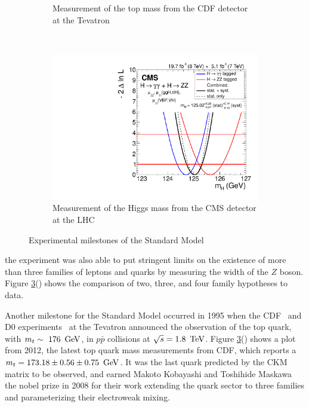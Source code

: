\begin{figure}
\begin{subfigure}[h]{0.3\textwidth}
     \caption{Measurement of the top mass from the CDF detector at the
       Tevatron \cite{ex:CDF_Top_Mass_image}} \label{fig:topMass_CDF}
   \end{subfigure}
   ~ %
   \begin{subfigure}[h]{0.3\textwidth}
     \includegraphics[width=\textwidth]{Figures/Experimental_Results/CMS_higgsMass_scan_1d_all.pdf}
     \caption{Measurement of the Higgs mass from the CMS detector at
       the LHC \cite{ex:CMS_Higgs_Mass_image}} \label{fig:higgsMass_CMS}
   \end{subfigure}
   \caption{Experimental milestones of the Standard Model}\label{fig:ex_milestones_sm}
\end{figure}

\noindent the experiment was also able to put stringent limits on the
existence of more than three families of leptons and quarks by
measuring the width of the $Z$ boson.  Figure
\ref{fig:ex_milestones_sm}() shows the
comparison of two, three, and four family hypotheses to data.   

\par Another milestone for the Standard Model occurred in 1995 when the
CDF~\cite{ex:CDF_topQuark} and D0 experiments~\cite{ex:D0_topQuark} at
the Tevatron announced the observation of the top quark, with
$m_{t}\sim~176~\,\text{Ge\hspace{-.08em}V}$, in $p\bar{p}$ collisions at $\sqrt{s}=1.8~\,\text{Te\hspace{-.08em}V}$.
Figure \ref{fig:ex_milestones_sm}() shows a
plot from 2012, the latest top quark mass measurements from CDF, which
reports a $m_{t} = 173.18 \pm 0.56 \pm 0.75~\,\text{Ge\hspace{-.08em}V}$. It was the last
quark predicted by the CKM matrix to be observed, and earned Makoto
Kobayashi and Toshihide Maskawa the nobel prize in 2008 for their work
extending the quark sector to three families and parameterizing their
electroweak mixing.    


